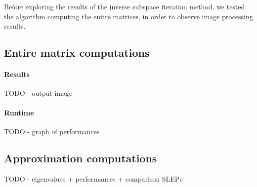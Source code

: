 Before exploring the results of the inverse subspace iteration method, we tested the algorithm computing the entire matrices, in order to observe image processing results.

\subsection{Entire matrix computations}

\paragraph{Results}
TODO - output image

\paragraph{Runtime}
TODO - graph of performances

\subsection{Approximation computations}
TODO - eigenvalues + performances + comparison SLEPc

